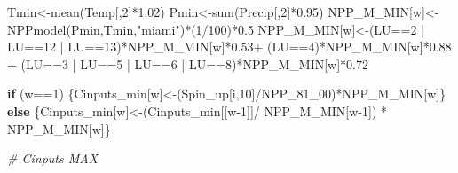 \documentclass[
  10pt,
  b5paper,
]{book}
\newenvironment{Shaded}{\begin{snugshade}}{\end{snugshade}}
\newcommand{\CommentTok}[1]{\textcolor[rgb]{0.56,0.35,0.01}{\textit{#1}}}
\newcommand{\ControlFlowTok}[1]{\textcolor[rgb]{0.13,0.29,0.53}{\textbf{#1}}}
\newcommand{\DecValTok}[1]{\textcolor[rgb]{0.00,0.00,0.81}{#1}}
\newcommand{\FloatTok}[1]{\textcolor[rgb]{0.00,0.00,0.81}{#1}}
\newcommand{\FunctionTok}[1]{\textcolor[rgb]{0.00,0.00,0.00}{#1}}
\newcommand{\NormalTok}[1]{#1}
\newcommand{\OtherTok}[1]{\textcolor[rgb]{0.56,0.35,0.01}{#1}}
\newcommand{\SpecialCharTok}[1]{\textcolor[rgb]{0.00,0.00,0.00}{#1}}
\newcommand{\StringTok}[1]{\textcolor[rgb]{0.31,0.60,0.02}{#1}}
\begin{document}
\begin{Shaded}
\begin{Highlighting}[]
\NormalTok{Tmin}\OtherTok{\textless{}{-}}\FunctionTok{mean}\NormalTok{(Temp[,}\DecValTok{2}\NormalTok{]}\SpecialCharTok{*}\FloatTok{1.02}\NormalTok{)}
\NormalTok{Pmin}\OtherTok{\textless{}{-}}\FunctionTok{sum}\NormalTok{(Precip[,}\DecValTok{2}\NormalTok{]}\SpecialCharTok{*}\FloatTok{0.95}\NormalTok{)}
\NormalTok{NPP\_M\_MIN[w]}\OtherTok{\textless{}{-}}\FunctionTok{NPPmodel}\NormalTok{(Pmin,Tmin,}\StringTok{"miami"}\NormalTok{)}\SpecialCharTok{*}\NormalTok{(}\DecValTok{1}\SpecialCharTok{/}\DecValTok{100}\NormalTok{)}\SpecialCharTok{*}\FloatTok{0.5}
\NormalTok{NPP\_M\_MIN[w]}\OtherTok{\textless{}{-}}\NormalTok{(LU}\SpecialCharTok{==}\DecValTok{2} \SpecialCharTok{|}\NormalTok{ LU}\SpecialCharTok{==}\DecValTok{12} \SpecialCharTok{|}\NormalTok{ LU}\SpecialCharTok{==}\DecValTok{13}\NormalTok{)}\SpecialCharTok{*}\NormalTok{NPP\_M\_MIN[w]}\SpecialCharTok{*}\FloatTok{0.53}\SpecialCharTok{+}\NormalTok{ (LU}\SpecialCharTok{==}\DecValTok{4}\NormalTok{)}\SpecialCharTok{*}\NormalTok{NPP\_M\_MIN[w]}\SpecialCharTok{*}\FloatTok{0.88} \SpecialCharTok{+}\NormalTok{ (LU}\SpecialCharTok{==}\DecValTok{3} \SpecialCharTok{|}\NormalTok{ LU}\SpecialCharTok{==}\DecValTok{5} \SpecialCharTok{|}\NormalTok{ LU}\SpecialCharTok{==}\DecValTok{6} \SpecialCharTok{|}\NormalTok{ LU}\SpecialCharTok{==}\DecValTok{8}\NormalTok{)}\SpecialCharTok{*}\NormalTok{NPP\_M\_MIN[w]}\SpecialCharTok{*}\FloatTok{0.72}

\ControlFlowTok{if}\NormalTok{ (w}\SpecialCharTok{==}\DecValTok{1}\NormalTok{) \{Cinputs\_min[w]}\OtherTok{\textless{}{-}}\NormalTok{(Spin\_up[i,}\DecValTok{10}\NormalTok{]}\SpecialCharTok{/}\NormalTok{NPP\_81\_00)}\SpecialCharTok{*}\NormalTok{NPP\_M\_MIN[w]\} }\ControlFlowTok{else}\NormalTok{ \{Cinputs\_min[w]}\OtherTok{\textless{}{-}}\NormalTok{(Cinputs\_min[[w}\DecValTok{{-}1}\NormalTok{]]}\SpecialCharTok{/}\NormalTok{ NPP\_M\_MIN[w}\DecValTok{{-}1}\NormalTok{]) }\SpecialCharTok{*}\NormalTok{ NPP\_M\_MIN[w]\} }

\CommentTok{\# Cinputs MAX}


\end{Highlighting}
\end{Shaded}
\end{document}
